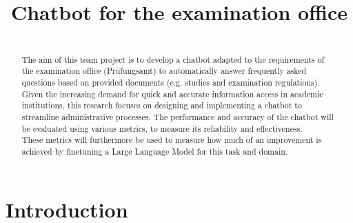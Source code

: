 \documentclass[conference]{IEEEtran}
\begin{document}


\title{Chatbot for the examination office
}

\author{
\and
{}
\and
{}
\and
{}
}


\maketitle

\begin{abstract} \\
The aim of this team project is to develop a chatbot adapted to the requirements of the examination office (Prüfungsamt) to automatically answer frequently asked questions based on provided documents (e.g. studies and examination regulations). Given the increasing demand for quick and accurate information access in academic institutions, this research focuses on designing and implementing a chatbot to streamline administrative processes. The performance and accuracy of the chatbot will be evaluated using various metrics, to measure its reliability and effectiveness.\\
These metrics will furthermore be used to measure how much of an improvement is achieved by finetuning a Large Language Model for this task and domain.
\end{abstract}


\section{Introduction}
\end{document}
